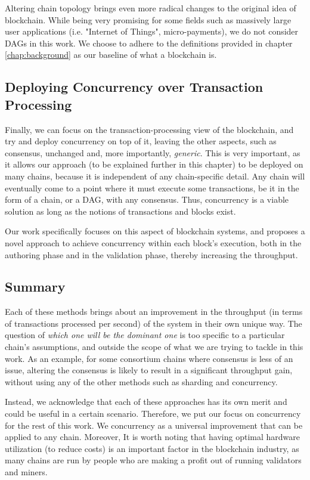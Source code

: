 Altering chain topology brings even more radical changes to the original idea of blockchain. While
being very promising for some fields such as massively large user applications (i.e. "Internet of
Things", micro-payments), we do not consider DAGs in this work. We choose to adhere to the
definitions provided in chapter \ref{chap:background} as our baseline of what a blockchain is.

\subsection{Deploying Concurrency over Transaction Processing}
\label{chap_approach:subsec:out_of_box_concurrency}

Finally, we can focus on the transaction-processing view of the blockchain, and try and deploy
concurrency on top of it, leaving the other aspects, such as consensus, unchanged and, more
importantly, \textit{generic}. This is very important, as it allows our approach (to be explained
further in this chapter) to be deployed on many chains, because it is independent of any
chain-specific detail. Any chain will eventually come to a point where it must execute some
transactions, be it in the form of a chain, or a DAG, with any consensus. Thus, concurrency is a
viable solution as long as the notions of transactions and blocks exist.

Our work specifically focuses on this aspect of blockchain systems, and proposes a novel approach to
achieve concurrency within each block's execution, both in the authoring phase and in the validation
phase, thereby increasing the throughput.

\subsection{Summary} \label{chap_bg:subsec:summary_speedup}

Each of these methods brings about an improvement in the throughput (in terms of transactions
processed per second) of the system in their own unique way. The question of \textit{which one will
be the dominant one} is too specific to a particular chain's assumptions, and outside the scope of
what we are trying to tackle in this work. As an example, for some consortium chains where consensus
is less of an issue, altering the consensus is likely to result in a significant throughput gain,
without using any of the other methods such as sharding and concurrency.

Instead, we acknowledge that each of these approaches has its own merit and could be useful in a
certain scenario. Therefore, we put our focus on concurrency for the rest of this work. We
concurrency as a universal improvement that can be applied to any chain. Moreover, It is worth
noting that having optimal hardware utilization (to reduce costs) is an important factor in the
blockchain industry, as many chains are run by people who are making a profit out of running
validators and miners.

